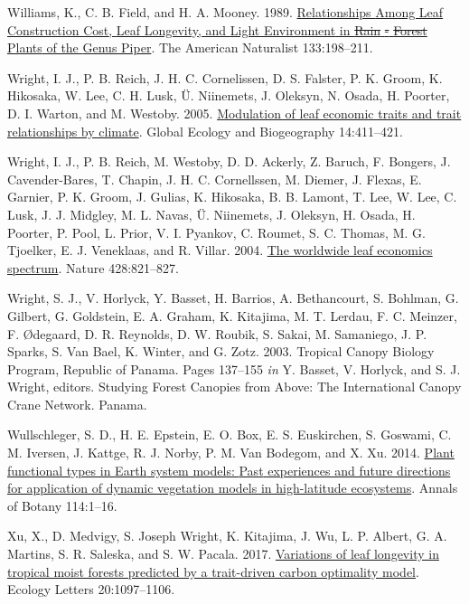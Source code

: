 \documentclass[
  12pt,
]{article}
\newlength{\cslhangindent} %
\newlength{\cslentryspacingunit} %
\newenvironment{CSLReferences}[2] %
 {%
  \setlength{\parindent}{0pt} %
  \ifodd #1 %
  \let\oldpar\par %
  \def\par{\hangindent=\cslhangindent\oldpar} %
  \fi %
  \setlength{\parskip}{#2\cslentryspacingunit} %
 }%
 {} %
\providecommand{\DIFaddtex}[1]{{\protect\color{blue}\uwave{#1}}} %
\providecommand{\DIFdeltex}[1]{{\protect\color{red}\sout{#1}}}                      %
\providecommand{\DIFaddbegin}{} %
\providecommand{\DIFaddend}{} %
\providecommand{\DIFdelbegin}{} %
\providecommand{\DIFdelend}{} %
\providecommand{\DIFadd}[1]{\texorpdfstring{\DIFaddtex{#1}}{#1}} %
\providecommand{\DIFdel}[1]{\texorpdfstring{\DIFdeltex{#1}}{}} %
\newcommand{\DIFscaledelfig}{0.5}
\newlength{\DIFdelgraphicswidth} %
\newlength{\DIFdelgraphicsheight} %
\newcommand{\DIFaddincludegraphics}[2][]{{\color{blue}\fbox{\DIFOincludegraphics[#1]{#2}}}} %
\newcommand{\DIFdelincludegraphics}[2][]{%
\sbox{\DIFdelgraphicsbox}{\DIFOincludegraphics[#1]{#2}}%
\settoboxwidth{\DIFdelgraphicswidth}{\DIFdelgraphicsbox} %
\settoboxtotalheight{\DIFdelgraphicsheight}{\DIFdelgraphicsbox} %
\scalebox{\DIFscaledelfig}{%
\parbox[b]{\DIFdelgraphicswidth}{\usebox{\DIFdelgraphicsbox}\\[-\baselineskip] \rule{\DIFdelgraphicswidth}{0em}}\llap{\resizebox{\DIFdelgraphicswidth}{\DIFdelgraphicsheight}{%
\setlength{\unitlength}{\DIFdelgraphicswidth}%
\begin{picture}(1,1)%
\thicklines\linethickness{2pt} %
{\color[rgb]{1,0,0}\put(0,0){\framebox(1,1){}}}%
{\color[rgb]{1,0,0}\put(0,0){\line( 1,1){1}}}%
{\color[rgb]{1,0,0}\put(0,1){\line(1,-1){1}}}%
\end{picture}%
}\hspace*{3pt}}} %
} %
\DeclareRobustCommand{\DIFaddbegin}{\DIFOaddbegin \let\includegraphics\DIFaddincludegraphics} %
\DeclareRobustCommand{\DIFaddend}{\DIFOaddend \let\includegraphics\DIFOincludegraphics} %
\DeclareRobustCommand{\DIFdelbegin}{\DIFOdelbegin \let\includegraphics\DIFdelincludegraphics} %
\DeclareRobustCommand{\DIFdelend}{\DIFOaddend \let\includegraphics\DIFOincludegraphics} %
\begin{document}
\begin{CSLReferences}{1}{0}
\leavevmode{}%
Williams, K., C. B. Field, and H. A. Mooney. 1989. \href{https://doi.org/10.1086/284910}{Relationships {Among Leaf Construction Cost}, {Leaf Longevity}, and {Light Environment} in {\DIFdelbegin \DIFdel{Rain}%
\DIFdel{-}%
\DIFdel{Forest }\DIFdelend \DIFaddbegin \DIFadd{Rain-Forest }\DIFaddend Plants} of the {Genus Piper}}. The American Naturalist 133:198--211.

\leavevmode{}%
Wright, I. J., P. B. Reich, J. H. C. Cornelissen, D. S. Falster, P. K. Groom, K. Hikosaka, W. Lee, C. H. Lusk, Ü. Niinemets, J. Oleksyn, N. Osada, H. Poorter, D. I. Warton, and M. Westoby. 2005. \href{https://doi.org/10.1111/j.1466-822x.2005.00172.x}{Modulation of leaf economic traits and trait relationships by climate}. Global Ecology and Biogeography 14:411--421.

\leavevmode{}%
Wright, I. J., P. B. Reich, M. Westoby, D. D. Ackerly, Z. Baruch, F. Bongers, J. Cavender-Bares, T. Chapin, J. H. C. Cornellssen, M. Diemer, J. Flexas, E. Garnier, P. K. Groom, J. Gulias, K. Hikosaka, B. B. Lamont, T. Lee, W. Lee, C. Lusk, J. J. Midgley, M. L. Navas, Ü. Niinemets, J. Oleksyn, H. Osada, H. Poorter, P. Pool, L. Prior, V. I. Pyankov, C. Roumet, S. C. Thomas, M. G. Tjoelker, E. J. Veneklaas, and R. Villar. 2004. \href{https://doi.org/10.1038/nature02403}{The worldwide leaf economics spectrum}. Nature 428:821--827.

\leavevmode{}%
Wright, S. J., V. Horlyck, Y. Basset, H. Barrios, A. Bethancourt, S. Bohlman, G. Gilbert, G. Goldstein, E. A. Graham, K. Kitajima, M. T. Lerdau, F. C. Meinzer, F. Ødegaard, D. R. Reynolds, D. W. Roubik, S. Sakai, M. Samaniego, J. P. Sparks, S. Van Bael, K. Winter, and G. Zotz. 2003. Tropical {Canopy Biology Program}, {Republic} of {Panama}. Pages 137--155 \emph{in} Y. Basset, V. Horlyck, and S. J. Wright, editors. Studying {Forest Canopies} from {Above}: {The International Canopy Crane Network}. {Panama}.

\leavevmode{}%
Wullschleger, S. D., H. E. Epstein, E. O. Box, E. S. Euskirchen, S. Goswami, C. M. Iversen, J. Kattge, R. J. Norby, P. M. Van Bodegom, and X. Xu. 2014. \href{https://doi.org/10.1093/aob/mcu077}{Plant functional types in {Earth} system models: {Past} experiences and future directions for application of dynamic vegetation models in high-latitude ecosystems}. Annals of Botany 114:1--16.

\leavevmode{}%
Xu, X., D. Medvigy, S. Joseph Wright, K. Kitajima, J. Wu, L. P. Albert, G. A. Martins, S. R. Saleska, and S. W. Pacala. 2017. \href{https://doi.org/10.1111/ele.12804}{Variations of leaf longevity in tropical moist forests predicted by a trait-driven carbon optimality model}. Ecology Letters 20:1097--1106.

\end{CSLReferences}
\end{document}
